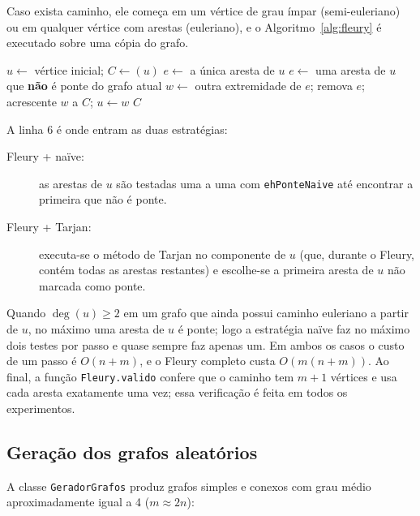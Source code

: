 \documentclass[a4paper,11pt]{article}
\begin{document}
Caso exista caminho, ele começa em um vértice de grau ímpar (semi-euleriano) ou em qualquer vértice
com arestas (euleriano), e o Algoritmo~\ref{alg:fleury} é executado sobre uma cópia do grafo.

\begin{algorithm}[H]
\caption{Método de Fleury}\label{alg:fleury}
\begin{algorithmic}[1]
\State $u \gets$ vértice inicial; $C \gets (u)$
    \State $e \gets$ a única aresta de $u$ 
  \Else
    \State $e \gets$ uma aresta de $u$ que \textbf{não} é ponte do grafo atual
  \EndIf
  \State $w \gets$ outra extremidade de $e$; remova $e$; acrescente $w$ a $C$; $u \gets w$
\EndWhile
\State \Return $C$
\end{algorithmic}
\end{algorithm}

A linha 6 é onde entram as duas estratégias:

\begin{description}
  \item[Fleury + naïve:] as arestas de $u$ são testadas uma a uma com \texttt{ehPonteNaive} até
        encontrar a primeira que não é ponte.
  \item[Fleury + Tarjan:] executa-se o método de Tarjan no componente de $u$ (que, durante o Fleury,
        contém todas as arestas restantes) e escolhe-se a primeira aresta de $u$ não marcada como ponte.
\end{description}

Quando $\deg(u)\ge 2$ em um grafo que ainda possui caminho euleriano a partir de $u$, no máximo uma
aresta de $u$ é ponte; logo a estratégia naïve faz no máximo dois testes por passo e quase sempre faz
apenas um. Em ambos os casos o custo de um passo é $O(n+m)$, e o Fleury completo custa $O(m(n+m))$.
Ao final, a função \texttt{Fleury.valido} confere que o caminho tem $m+1$ vértices e usa cada aresta
exatamente uma vez; essa verificação é feita em todos os experimentos.

\subsection{Geração dos grafos aleatórios}

A classe \texttt{GeradorGrafos} produz grafos simples e conexos com grau médio aproximadamente igual a
4 ($m\approx 2n$):
\end{document}
